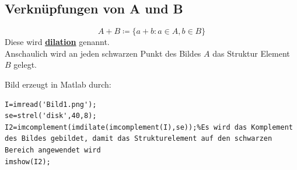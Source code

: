 \documentclass{article}
\theoremstyle{plain}
\theoremstyle{definition}
\numberwithin{equation}{section}
\newcommand{\mim}[1] {
\underline{\textbf{#1\index{#1}}}
}
\begin{document}
    \subsection{Verknüpfungen von A und B}
        \[A+B  \coloneqq  \{a + b : a \in A, b \in B\}\]
        Diese wird \mim{dilation} genannt.\\
        Anschaulich wird an jeden schwarzen Punkt des Bildes $A$ das Struktur Element $B$ gelegt.
        \begin{center}
        \end{center}
        Bild erzeugt in Matlab durch:\\
        \begin{lstlisting}
I=imread('Bild1.png');
se=strel('disk',40,8);
I2=imcomplement(imdilate(imcomplement(I),se));%Es wird das Komplement des Bildes gebildet, damit das Strukturelement auf den schwarzen Bereich angewendet wird
imshow(I2);
        \end{lstlisting}
\end{document}
